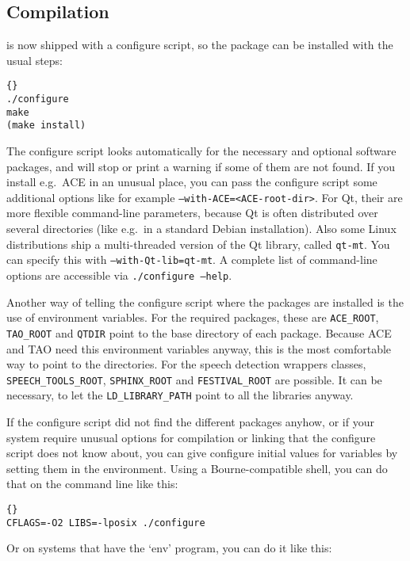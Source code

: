 \subsection{Compilation}

\miro is now shipped with a configure script, so the package can be
installed with the usual steps:

\begin{lstlisting}[frame=tb]{}
./configure
make 
(make install)
\end{lstlisting}

The configure script looks automatically for the necessary and
optional software packages, and will stop or print a warning if some
of them are not found. If you install e.g.\ ACE in an unusual place,
you can pass the configure script some additional options like for
example \texttt{--with-ACE=<ACE-root-dir>}. For Qt, their are more
flexible command-line parameters, because Qt is often distributed over
several directories (like e.g.\ in a standard Debian installation).
Also some Linux distributions ship a multi-threaded version of the Qt
library, called \texttt{qt-mt}.  You can specify this with
\texttt{--with-Qt-lib=qt-mt}. A complete list of command-line options
are accessible via \texttt{./configure --help}.

Another way of telling the configure script where the packages are
installed is the use of environment variables. For the required
packages, these are \texttt{ACE\_ROOT}, \texttt{TAO\_ROOT} and
\texttt{QTDIR} point to the base directory of each package. Because
ACE and TAO need this environment variables anyway, this is the most
comfortable way to point to the directories. For the speech detection
wrappers classes, \texttt{SPEECH\_TOOLS\_ROOT}, \texttt{SPHINX\_ROOT}
and \texttt{FESTIVAL\_ROOT} are possible. It can be necessary, to let
the \texttt{LD\_LIBRARY\_PATH} point to all the libraries anyway.

If the configure script did not find the different packages anyhow, or
if your system require unusual options for compilation or linking that
the configure script does not know about, you can give configure
initial values for variables by setting them in the environment. Using
a Bourne-compatible shell, you can do that on the command line like
this:

\begin{lstlisting}[frame=tb]{}
CFLAGS=-O2 LIBS=-lposix ./configure
\end{lstlisting}

Or on systems that have the `env' program, you can do it like this:

